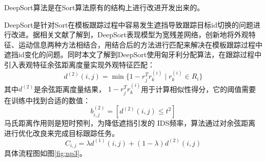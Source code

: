 \begin{table}[htbp]
	\centering
	\caption{YOLOv5 各版本模型对比}
	\label{tab:YOLOv5_models}
\end{table}



DeepSort算法是在Sort算法原有的结构上进行改进开发出来的。



DeepSort是针对Sort在模板跟踪过程中容易发生遮挡导致跟踪目标id切换的问题进行改进。据相关文献\cite{liu2023yolov5deepsort}了解到，DeepSort表现模型为宽残差网络，创新地将外观特征、运动信息两种方法相结合，用结合后的方法进行匹配来解决在模板跟踪过程中遮挡id变化的问题。同时本文了解到DeepSort使用匈牙利分配算法，在跟踪过程中引入表观特征余弦距离度量实现外观特征匹配：\[ d^{(2)}(i,j) = \min \{ 1 - r_j^T r_k^{(i)} \mid r_k^{(i)} \in R_i \} \]其中\(d^{(2)}\)是余弦距离度量结果， \(1 - r_j^T r_k^{(i)}\)用于计算相似性得分，它的阈值需要在训练中找到合适的数值：\[b_{i,j}^{(2)}=\left[d^{(2)}(i,j) \leqslant t^{2}\right]\]马氏距离作用则是短时预判，为降低遮挡引发的 IDS频率，算法通过对余弦距离进行优化改良来完成目标跟踪任务。\[C_{i,j} = \lambda d^{(1)}(i,j) + (1 - \lambda) d^{(2)}(i,j)\]具体流程图如图\ref{fig:np3}。




